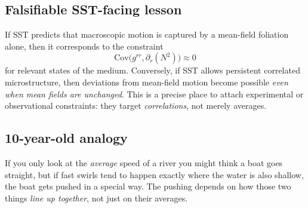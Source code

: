\documentclass[11pt,a4paper]{article}
\theoremstyle{thmstyleone}
\theoremstyle{thmstyletwo}
\theoremstyle{thmstylethree}
\begin{document}
        \subsection{Falsifiable SST-facing lesson}
            If SST predicts that macroscopic motion is captured by a mean-field foliation alone, then it corresponds to the constraint
            \begin{equation}
                \mathrm{Cov}\!\big(g^{rr},\partial_r(N^2)\big)\approx 0
            \end{equation}
            for relevant states of the medium. Conversely, if SST allows persistent correlated microstructure, then deviations from
            mean-field motion become possible \emph{even when mean fields are unchanged}. This is a precise place to attach experimental
            or observational constraints: they target \emph{correlations}, not merely averages.

        \subsection*{10-year-old analogy}
            If you only look at the \emph{average} speed of a river you might think a boat goes straight, but if fast swirls tend to happen
            exactly where the water is also shallow, the boat gets pushed in a special way. The pushing depends on how those two things
            \emph{line up together}, not just on their averages.
\end{document}
